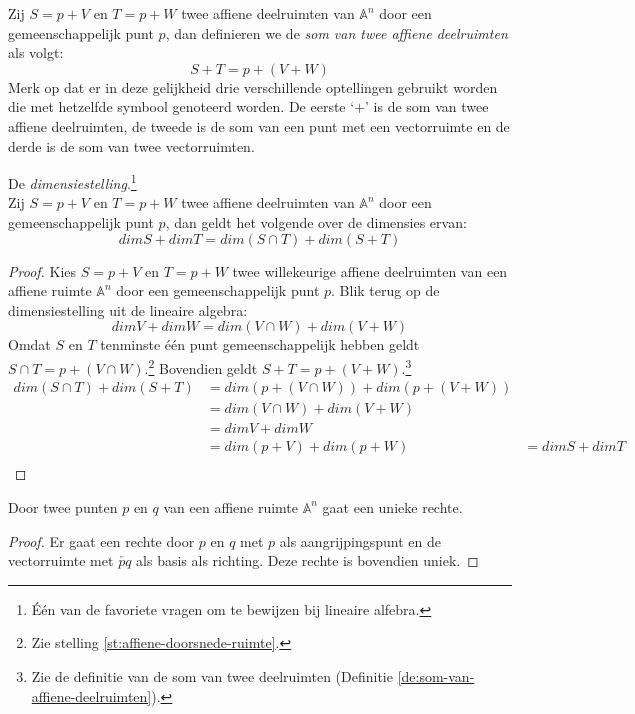 \documentclass[main.tex]{subfiles}
\begin{document}
\begin{de}
\label{de:som-van-affiene-deelruimten}
  Zij $S = p + V$ en $T = p + W$ twee affiene deelruimten van $\mathbb{A}^{n}$ door een gemeenschappelijk punt $p$, dan definieren we de \emph{som van twee affiene deelruimten} als volgt:
  \[ S + T = p + (V + W) \]
  Merk op dat er in deze gelijkheid drie verschillende optellingen gebruikt worden die met hetzelfde symbool genoteerd worden. De eerste `$+$' is de som van twee affiene deelruimten, de tweede is de som van een punt met een vectorruimte en de derde is de som van twee vectorruimten.
\end{de}

\begin{st}
  De \emph{dimensiestelling}.\footnote{\'E\'en van de favoriete vragen om te bewijzen bij lineaire alfebra.}\\
  Zij $S = p + V$ en $T = p + W$ twee affiene deelruimten van $\mathbb{A}^{n}$ door een gemeenschappelijk punt $p$, dan geldt het volgende over de dimensies ervan:
  \[ dim S + dim T = dim(S \cap T) + dim (S + T) \]

  \begin{proof}
    Kies $S = p + V$ en $T = p + W$ twee willekeurige affiene deelruimten van een affiene ruimte $\mathbb{A}^{n}$ door een gemeenschappelijk punt $p$.
    Blik terug op de dimensiestelling uit de lineaire algebra:
    \[ dim V + dim W = dim(V \cap W) + dim (V + W) \]
    Omdat $S$ en $T$ tenminste \'e\'en punt gemeenschappelijk hebben geldt $S \cap T = p + (V \cap W)$.\footnote{Zie stelling \ref{st:affiene-doorsnede-ruimte}.} Bovendien geldt $S + T = p + (V + W)$.\footnote{Zie de definitie van de som van twee deelruimten (Definitie \ref{de:som-van-affiene-deelruimten}).} 
    \[
    \begin{array}{rll}
       dim(S \cap T) + dim (S + T) &= dim(p + (V \cap W)) + dim(p + (V + W)) &\\
                    &= dim(V \cap W) + dim (V + W)&\\
                    &= dim V + dim W&\\
                    &= dim(p + V) + dim(p + W) &= dim S + dim T\\
    \end{array}
    \]

  \end{proof}
\end{st}

\begin{st}
  Door twee punten $p$ en $q$ van een affiene ruimte $\mathbb{A}^{n}$ gaat een unieke rechte.

  \begin{proof}
    Er gaat een rechte door $p$ en $q$ met $p$ als aangrijpingspunt en de vectorruimte met $\overleftarrow{pq}$ als basis als richting.
    Deze rechte is bovendien uniek.
  \end{proof}
\end{st}
\end{document}
